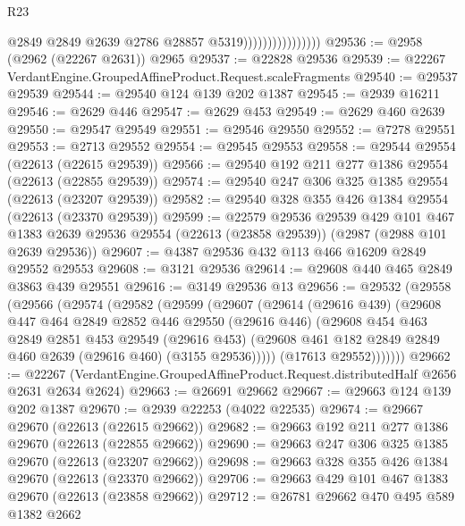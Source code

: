 \begin{lexlean}{R23}
\begin{coremodule}
                                    @2849
                                    @2849
                                    @2639
                                    @2786
                                    @28857
                                    @5319))))))))))))))))
@29536 := @2958 (@2962 (@22267 @2631)) @2965
@29537 := @22828 @29536
@29539 := @22267 VerdantEngine.GroupedAffineProduct.Request.scaleFragments
@29540 := @29537 @29539
@29544 := @29540 @124 @139 @202 @1387
@29545 := @2939 @16211
@29546 := @2629 @446
@29547 := @2629 @453
@29549 := @2629 @460 @2639
@29550 := @29547 @29549
@29551 := @29546 @29550
@29552 := @7278 @29551
@29553 := @2713 @29552
@29554 := @29545 @29553
@29558 := @29544 @29554 (@22613 (@22615 @29539))
@29566 := @29540 @192 @211 @277 @1386 @29554 (@22613 (@22855 @29539))
@29574 := @29540 @247 @306 @325 @1385 @29554 (@22613 (@23207 @29539))
@29582 := @29540 @328 @355 @426 @1384 @29554 (@22613 (@23370 @29539))
@29599 := @22579
    @29536
    @29539
    @429
    @101
    @467
    @1383
    @2639
    @29536
    @29554
    (@22613 (@23858 @29539))
    (@2987 (@2988 @101 @2639 @29536))
@29607 := @4387 @29536 @432 @113 @466 @16209 @2849 @29552 @29553
@29608 := @3121 @29536
@29614 := @29608 @440 @465 @2849 @3863 @439 @29551
@29616 := @3149 @29536 @13
@29656 := @29532
    (@29558
      (@29566
        (@29574
          (@29582
            (@29599
              (@29607
                (@29614
                  (@29616 @439)
                  (@29608
                    @447
                    @464
                    @2849
                    @2852
                    @446
                    @29550
                    (@29616 @446)
                    (@29608
                      @454
                      @463
                      @2849
                      @2851
                      @453
                      @29549
                      (@29616 @453)
                      (@29608 @461 @182 @2849 @2849 @460 @2639 (@29616 @460) (@3155 @29536)))))
                (@17613 @29552)))))))
@29662 := @22267
    (VerdantEngine.GroupedAffineProduct.Request.distributedHalf @2656 @2631 @2634 @2624)
@29663 := @26691 @29662
@29667 := @29663 @124 @139 @202 @1387
@29670 := @2939 @22253 (@4022 @22535)
@29674 := @29667 @29670 (@22613 (@22615 @29662))
@29682 := @29663 @192 @211 @277 @1386 @29670 (@22613 (@22855 @29662))
@29690 := @29663 @247 @306 @325 @1385 @29670 (@22613 (@23207 @29662))
@29698 := @29663 @328 @355 @426 @1384 @29670 (@22613 (@23370 @29662))
@29706 := @29663 @429 @101 @467 @1383 @29670 (@22613 (@23858 @29662))
@29712 := @26781 @29662 @470 @495 @589 @1382 @2662

\end{coremodule}
\end{lexlean}
